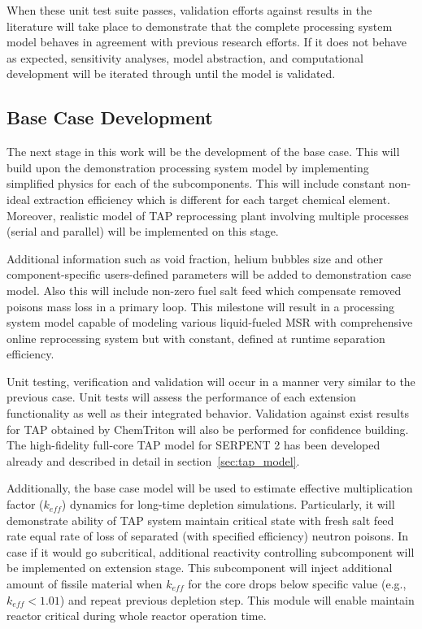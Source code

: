 When these unit test suite passes, validation efforts against results 
in the literature will take place to demonstrate that the complete 
processing system model behaves in agreement with previous research 
efforts. If it does not behave as expected, sensitivity analyses, 
model abstraction, and computational development will be iterated 
through until the model is validated.

\subsection{Base Case Development}
The next stage in this work will be the development of the base case. 
This will build upon the demonstration processing system model by 
implementing simplified physics for each of the subcomponents. This 
will include constant non-ideal extraction efficiency which is 
different for each target chemical element. Moreover, realistic 
model of \gls{TAP} reprocessing plant involving multiple 
processes (serial and parallel) will be implemented on this 
stage. 

Additional information such as void fraction, helium 
bubbles size and other component-specific users-defined 
parameters will be added to demonstration case model.
Also this will include non-zero fuel salt feed which 
compensate removed poisons mass loss in a primary loop.
This milestone will result in a processing system model capable of 
modeling various liquid-fueled \gls{MSR} with comprehensive 
online reprocessing system but with constant, defined at runtime 
separation efficiency.

Unit testing, verification and validation will occur in a manner 
very similar to the previous case. Unit tests will assess the 
performance of each extension functionality as well as their 
integrated behavior. Validation against exist results for \gls{TAP} 
obtained by ChemTriton \cite{betzler_two-dimensional_2016, 
betzler_molten_2017} will also be performed for confidence 
building. The high-fidelity full-core \gls{TAP} model for 
SERPENT 2 has been developed already and described in detail 
in section~\ref{sec:tap_model}.

Additionally, the base case model will be used to estimate 
effective 
multiplication factor ($k_{eff}$) dynamics for long-time 
depletion simulations. Particularly, it will demonstrate 
ability of \gls{TAP} system maintain critical state with 
fresh salt feed rate equal rate of loss 
of separated (with specified efficiency) neutron poisons. 
In case if it would go subcritical, additional reactivity 
controlling subcomponent 
will be implemented on extension stage. This subcomponent 
will inject additional amount of fissile material 
when $k_{eff}$ for the core drops below specific value (e.g., 
$k_{eff}<1.01$) and 
repeat previous depletion step. This module will enable 
maintain reactor critical during whole reactor 
operation time.
 

